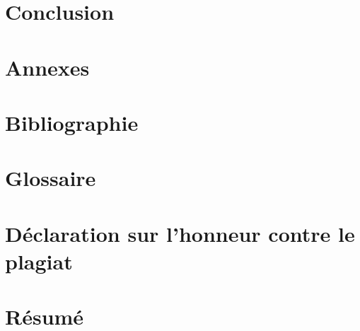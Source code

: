 \documentclass[11pt]{article}
\begin{document}
\section*{Conclusion}
\newpage

\section*{Annexes}

\section*{Bibliographie}
\newpage

\section*{Glossaire}

\section*{Déclaration sur l'honneur contre le plagiat}

\newpage

\newpage
\section*{Résumé}
\end{document}
